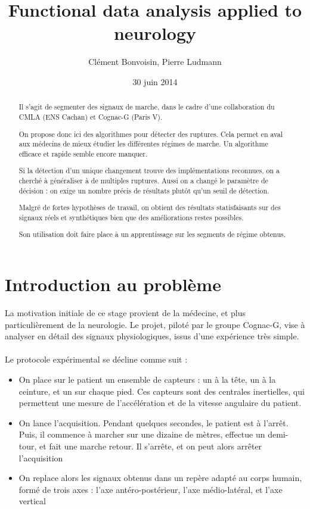 \documentclass[french,12pt]{report}
\begin{document}
	\title{Functional data analysis applied to neurology}
	\author{Clément Bonvoisin, Pierre Ludmann}
	\date{30 juin 2014}
	\maketitle

	\begin{abstract}
  
Il s'agit de segmenter des signaux de marche,
dans le cadre d'une collaboration du CMLA (ENS Cachan) et Cognac-G (Paris V).

On propose donc ici des algorithmes pour détecter des ruptures.
Cela permet en aval aux médecins de mieux étudier les différentes régimes de marche.
Un algorithme efficace et rapide semble encore manquer.

Si la détection d'un unique changement trouve des implémentations reconnues,
on a cherché à généraliser à de multiples ruptures.
Aussi on a changé le paramètre de décision : on exige un nombre précis de résultats plutôt qu'un seuil de détection.

Malgré de fortes hypothèses de travail,
on obtient des résultats statisfaisants sur des signaux réels et synthétiques
bien que des améliorations restes possibles.

Son utilisation doit faire place à un apprentissage sur les segments de régime obtenus.
	
	\end{abstract}

	\tableofcontents

	\chapter{Introduction au problème}
	
		La motivation initiale de ce stage provient de la médecine, et plus particulièrement de la neurologie. Le projet, piloté par le groupe Cognac-G, vise à analyser en détail des signaux physiologiques, issus d'une expérience très simple.
	\\ \\
	Le protocole expérimental se décline comme suit :
	\begin{itemize}
		\item On place sur le patient un ensemble de capteurs : un à la tête, un à la ceinture, et un sur chaque pied. Ces capteurs sont des centrales inertielles, qui permettent une mesure de l'accélération et de la vitesse angulaire du patient.
		\item On lance l'acquisition. Pendant quelques secondes, le patient est à l'arrêt. Puis, il commence à marcher sur une dizaine de mètres, effectue un demi-tour, et fait une marche retour. Il s'arrête, et on peut alors arrêter l'acquisition
		\item On replace alors les signaux obtenus dans un repère adapté au corps humain, formé de trois axes : l'axe antéro-postérieur, l'axe médio-latéral, et l'axe vertical
	\end{itemize}
	
\end{document}
